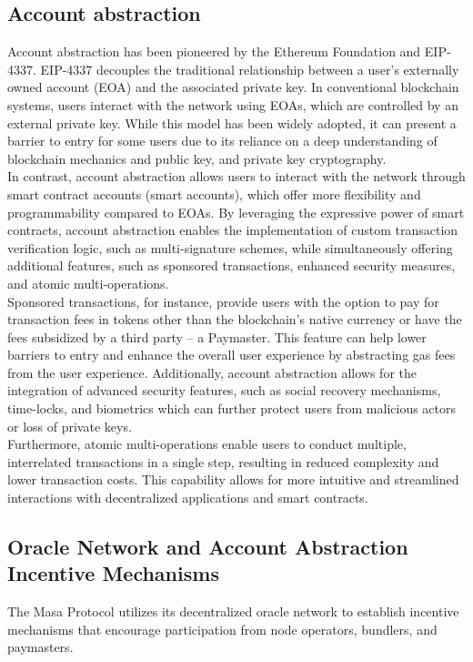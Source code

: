 \documentclass{article}
\begin{document}
\subsection{Account abstraction}
Account abstraction has been pioneered by the Ethereum Foundation and EIP-4337\cite{eip4337}. EIP-4337 decouples the traditional relationship between a user's externally owned account (EOA) and the associated private key. In conventional blockchain systems, users interact with the network using EOAs, which are controlled by an external private key. While this model has been widely adopted, it can present a barrier to entry for some users due to its reliance on a deep understanding of blockchain mechanics and public key, and private key cryptography.
\\
\newline
In contrast, account abstraction allows users to interact with the network through smart contract accounts (smart accounts), which offer more flexibility and programmability compared to EOAs. By leveraging the expressive power of smart contracts, account abstraction enables the implementation of custom transaction verification logic, such as multi-signature schemes, while simultaneously offering additional features, such as sponsored transactions, enhanced security measures, and atomic multi-operations.
\\
\newline
Sponsored transactions, for instance, provide users with the option to pay for transaction fees in tokens other than the blockchain's native currency or have the fees subsidized by a third party – a Paymaster. This feature can help lower barriers to entry and enhance the overall user experience by abstracting gas fees from the user experience. Additionally, account abstraction allows for the integration of advanced security features, such as social recovery mechanisms, time-locks, and biometrics which can further protect users from malicious actors or loss of private keys.
\\
\newline
Furthermore, atomic multi-operations enable users to conduct multiple, interrelated transactions in a single step, resulting in reduced complexity and lower transaction costs. This capability allows for more intuitive and streamlined interactions with decentralized applications and smart contracts.

\subsection{Oracle Network and Account Abstraction Incentive Mechanisms}
The Masa Protocol utilizes its decentralized oracle network to establish incentive mechanisms that encourage participation from node operators, bundlers, and paymasters. 
\end{document}

